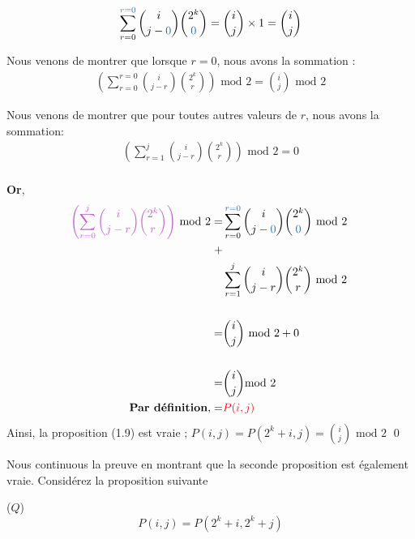 \documentclass[16pt]{report}
\begin{document}
\begin{multicols*}{2}
\begin{Preuve*}{}{}
       \begin{align}
              \sum_{r=0}^{\textcolor{myb}{r=0}} {i \choose j - \textcolor{myb}{0}} {2^k \choose \textcolor{myb}{0}} = 
              {i \choose j} \times 1  = {i \choose j}
       \end{align}

            Nous venons de montrer que lorsque $r = 0$, nous avons la sommation :  
              \begin{align*}
                  \left( \sum_{r=0}^{r=0} {i \choose j-r} {2^k \choose r} \right) \text{ mod 2}
                  = {i \choose j} \text{ mod 2}
            \end{align*}  

            Nous venons de montrer que pour toutes autres valeurs de $r$, 
            nous avons la sommation:  
              \begin{align*}
                  \left( \sum_{r=1}^{j} {i \choose j-r} {2^k \choose r} \right) \text{ mod 2}
                  = 0  
            \end{align*}  
            \vspace{1em} \\ 
            \textbf{Or},   
              \begin{align*}
                  \textcolor{myp}{\left( \sum_{r=0}^{j} {i \choose j-r} {2^k \choose r} \right)} \text{ mod 2}
         = &\sum_{r=0}^{\textcolor{myb}{r=0}} {i \choose j - \textcolor{myb}{0}} {2^k \choose \textcolor{myb}{0}} 
         \text{ mod 2} \\ + \\ 
           &\sum_{r=1}^{j} {i \choose j-r} {2^k \choose r} \text{ mod 2 } \\ \\ 
         = &{i \choose j}\text{ mod 2} + 0\\   \\ 
         = &{i \choose j} \text{mod 2} \\ 
         \textbf{Par définition}\text{,} = &\textcolor{red}{P(i, j)}
            \end{align*} 
        Ainsi, la proposition (1.9) est vraie ; $P(i,j) = P(2^k +i, j) = {i \choose j} \text{ mod 2}$ \qed
        \end{Preuve*}
        Nous continuous la preuve en montrant que la seconde proposition est également vraie. 
        Considérez la proposition suivante 
        \begin{prop}{($Q$)}{}
            \[ P(i, j) = P(2^k +i, 2^k + j) \]
        \end{prop}

\end{multicols*}
\end{document}
